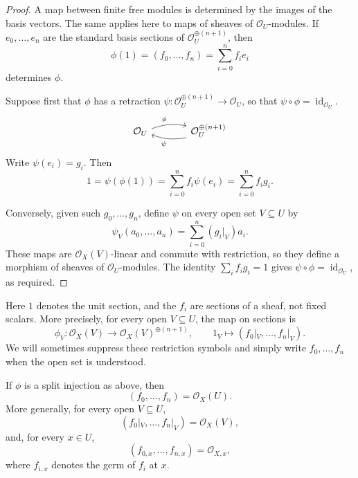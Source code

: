 \begin{proof}
    A map between finite free modules is determined by the images of the
    basis vectors. The same applies here to maps of sheaves of
    \(\mathcal{O}_U\)-modules. If \(e_0,\dots,e_n\) are the standard basis
    sections of \(\mathcal{O}_U^{\oplus(n+1)}\), then
    \[
        \phi(1)=(f_0,\dots,f_n)=\sum_{i=0}^n f_i e_i
    \]
    determines \(\phi\).

    Suppose first that \(\phi\) has a retraction
    \(\psi:\mathcal{O}_U^{\oplus(n+1)}\to\mathcal{O}_U\), so that
    \(\psi\circ\phi=\operatorname{id}_{\mathcal{O}_U}\).
    \[
        \begin{tikzcd}[column sep=large]
            \mathcal{O}_U \arrow[r,"\phi",bend left=15]
            & \mathcal{O}_U^{\oplus(n+1)}
            \arrow[l,"\psi",bend left=15]
        \end{tikzcd}
    \]
    Write \(\psi(e_i)=g_i\). Then
    \[
        1=\psi(\phi(1))
        =\sum_{i=0}^n f_i\psi(e_i)
        =\sum_{i=0}^n f_i g_i.
    \]

    Conversely, given such \(g_0,\dots,g_n\), define \(\psi\) on every open
    set \(V\subseteq U\) by
    \[
        \psi_V(a_0,\dots,a_n)
        =\sum_{i=0}^n (g_i|_V)a_i.
    \]
    These maps are \(\mathcal{O}_X(V)\)-linear and commute with restriction,
    so they define a morphism of sheaves of \(\mathcal{O}_U\)-modules.
    The identity \(\sum_i f_i g_i=1\) gives
    \(\psi\circ\phi=\operatorname{id}_{\mathcal{O}_U}\), as required.
\end{proof}

\begin{remark}\label{rem:lsi-sections}
    Here \(1\) denotes the unit section, and the \(f_i\) are sections of a
    sheaf, not fixed scalars. More precisely, for every open
    \(V\subseteq U\), the map on sections is
    \[
        \phi_V:\mathcal{O}_X(V)
        \longrightarrow\mathcal{O}_X(V)^{\oplus(n+1)},
        \qquad
        1_V\longmapsto(f_0|_V,\dots,f_n|_V).
    \]
    We will sometimes suppress these restriction symbols and simply write
    \(f_0,\dots,f_n\) when the open set is understood.
\end{remark}

\begin{corollary}\label{cor:lsi-unit-ideal}
    If \(\phi\) is a split injection as above, then
    \[
        (f_0,\dots,f_n)=\mathcal{O}_X(U).
    \]
    More generally, for every open \(V\subseteq U\),
    \[
        (f_0|_V,\dots,f_n|_V)=\mathcal{O}_X(V),
    \]
    and, for every \(x\in U\),
    \[
        (f_{0,x},\dots,f_{n,x})=\mathcal{O}_{X,x},
    \]
    where \(f_{i,x}\) denotes the germ of \(f_i\) at \(x\).
\end{corollary}

